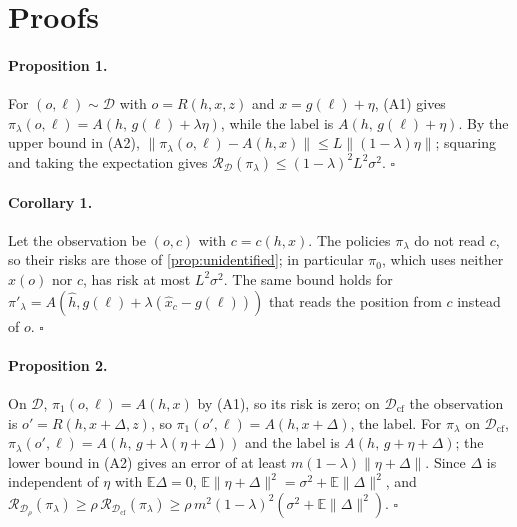 \clearpage
\setcounter{page}{1}
\maketitlesupplementary

\section{Proofs}
\label{sec:supp:proofs}

\paragraph{Proposition 1.}
For $(o,\ell)\sim\mathcal{D}$ with $o=R(h,x,z)$ and $x=g(\ell)+\eta$, (A1) gives
$\pi_\lambda(o,\ell)=A(h,\,g(\ell)+\lambda\eta)$, while the label is $A(h,\,g(\ell)+\eta)$. By the upper bound in (A2),
$\lVert\pi_\lambda(o,\ell)-A(h,x)\rVert\le L\lVert(1-\lambda)\eta\rVert$; squaring and taking the expectation gives
$\mathcal{R}_{\mathcal{D}}(\pi_\lambda)\le(1-\lambda)^2L^2\sigma^2$. \hfill$\square$

\paragraph{Corollary 1.}
Let the observation be $(o,c)$ with $c=c(h,x)$. The policies $\pi_\lambda$ do not read $c$, so their risks are those of
\cref{prop:unidentified}; in particular $\pi_0$, which uses neither $\hat x(o)$ nor $c$, has risk at most $L^2\sigma^2$.
The same bound holds for $\pi'_\lambda=A(\hat h, g(\ell)+\lambda(\hat x_c-g(\ell)))$ that reads the position from $c$
instead of $o$. \hfill$\square$

\paragraph{Proposition 2.}
On $\mathcal{D}$, $\pi_1(o,\ell)=A(h,x)$ by (A1), so its risk is zero; on $\mathcal{D}_{\text{cf}}$ the observation is
$o'=R(h,x+\Delta,z)$, so $\pi_1(o',\ell)=A(h,x+\Delta)$, the label. For $\pi_\lambda$ on $\mathcal{D}_{\text{cf}}$,
$\pi_\lambda(o',\ell)=A(h,\,g+\lambda(\eta+\Delta))$ and the label is $A(h,\,g+\eta+\Delta)$; the lower bound in (A2)
gives an error of at least $m(1-\lambda)\lVert\eta+\Delta\rVert$. Since $\Delta$ is independent of $\eta$ with
$\mathbb{E}\Delta=0$, $\mathbb{E}\lVert\eta+\Delta\rVert^2=\sigma^2+\mathbb{E}\lVert\Delta\rVert^2$, and
$\mathcal{R}_{\mathcal{D}_\rho}(\pi_\lambda)\ge\rho\,\mathcal{R}_{\mathcal{D}_{\text{cf}}}(\pi_\lambda)\ge\rho\,m^2(1-\lambda)^2
(\sigma^2+\mathbb{E}\lVert\Delta\rVert^2)$. \hfill$\square$

